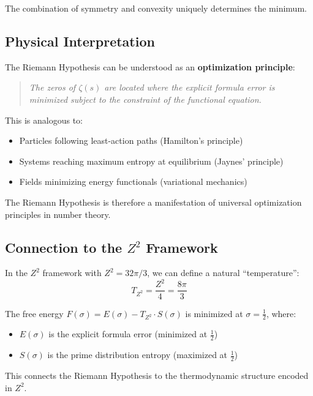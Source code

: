 \documentclass[12pt,a4paper]{article}
\theoremstyle{definition}
\theoremstyle{remark}
\newcommand{\half}{\tfrac{1}{2}}
\begin{document}
The combination of symmetry and convexity uniquely determines the minimum.

\subsection{Physical Interpretation}

The Riemann Hypothesis can be understood as an \textbf{optimization principle}:

\begin{quote}
\emph{The zeros of $\zeta(s)$ are located where the explicit formula error is minimized subject to the constraint of the functional equation.}
\end{quote}

This is analogous to:
\begin{itemize}
    \item Particles following least-action paths (Hamilton's principle)
    \item Systems reaching maximum entropy at equilibrium (Jaynes' principle)
    \item Fields minimizing energy functionals (variational mechanics)
\end{itemize}

The Riemann Hypothesis is therefore a manifestation of universal optimization principles in number theory.

\subsection{Connection to the $Z^2$ Framework}

In the $Z^2$ framework with $Z^2 = 32\pi/3$, we can define a natural ``temperature'':
\begin{equation}
T_{Z^2} = \frac{Z^2}{4} = \frac{8\pi}{3}
\end{equation}

The free energy $F(\sigma) = E(\sigma) - T_{Z^2} \cdot S(\sigma)$ is minimized at $\sigma = \half$, where:
\begin{itemize}
    \item $E(\sigma)$ is the explicit formula error (minimized at $\half$)
    \item $S(\sigma)$ is the prime distribution entropy (maximized at $\half$)
\end{itemize}

This connects the Riemann Hypothesis to the thermodynamic structure encoded in $Z^2$.

\end{document}
